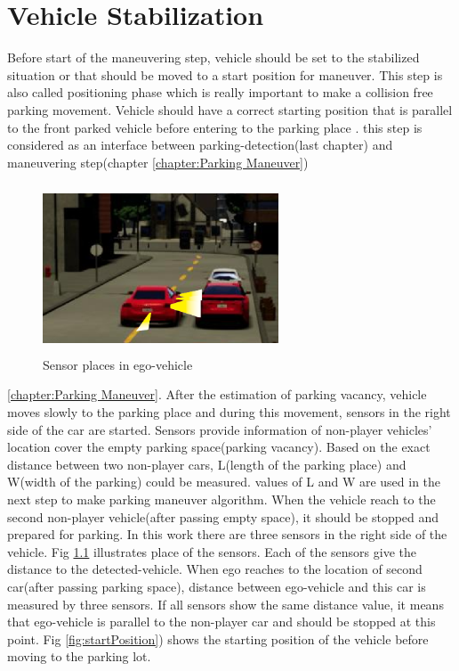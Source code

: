 \chapter{Vehicle Stabilization}\label{chapter: stabilization}
Before start of the maneuvering step, vehicle should be set to the stabilized situation or that should be moved to a start position for maneuver. This step is also called positioning phase which is really important to make a collision free parking movement. Vehicle should have a correct starting position that is parallel to the front parked vehicle before entering to the parking place \cite{3phaseMobileRobot}. this step is considered as an interface between parking-detection(last chapter) and maneuvering step(chapter \ref{chapter:Parking Maneuver})
\begin{figure}
    \centering
    \includegraphics[width=7cm, height=5cm]{images/sensorPlace.png}
    \caption{Sensor places in ego-vehicle}
    \label{fig:sensorPlaces}
\end{figure}
\ref{chapter:Parking Maneuver}.
After the estimation of parking vacancy, vehicle moves slowly to the parking place and during this movement, sensors in the right side of the car are started. Sensors provide information of non-player vehicles' location cover the empty parking space(parking vacancy). Based on the exact distance between two non-player cars, L(length of the parking place) and W(width of the parking) could be measured. values of L and W are used in the next step to make parking maneuver algorithm. When the vehicle reach to the second non-player vehicle(after passing empty space), it should be stopped and prepared for parking. In this work there are three sensors in the right side of the vehicle. Fig \ref{fig:sensorPlaces} illustrates place of the sensors. Each of the sensors give the distance to the detected-vehicle. When ego reaches to the location of second car(after passing parking space), distance between ego-vehicle and this car is measured by three sensors. If all sensors show the same distance value, it means that ego-vehicle is parallel to the non-player car and should be stopped at this point. Fig \ref{fig:startPosition}) shows the starting position of the vehicle before moving to the parking lot.
